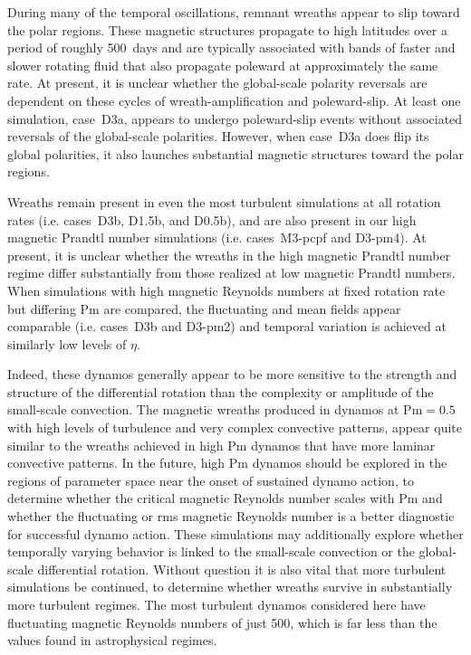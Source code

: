 During many of the temporal oscillations, remnant
wreaths appear to slip toward the polar regions.  These magnetic
structures propagate to high latitudes over a period of roughly
500~days and are typically associated with bands of faster and slower
rotating fluid that also propagate poleward at approximately the same
rate. At present, it is unclear whether the global-scale polarity
reversals are dependent on these cycles of wreath-amplification and 
poleward-slip.  At least one simulation, case~D3a, appears to undergo
poleward-slip events without associated reversals of the global-scale
polarities.  However, when case~D3a does flip its global polarities, 
it also launches substantial magnetic structures toward the polar
regions.

Wreaths remain present in even the
most turbulent simulations at all rotation rates (i.e. cases~D3b, D1.5b,
and D0.5b), and are also present in our high magnetic Prandtl number
simulations (i.e. cases~M3-pcpf and D3-pm4).  At present, it is
unclear whether the wreaths in the high magnetic Prandtl number
regime differ substantially from those realized at low magnetic
Prandtl numbers.  
When simulations with high magnetic
Reynolds numbers at fixed rotation rate but differing $\mathrm{Pm}$
are compared, the fluctuating and mean fields appear 
comparable (i.e. cases~D3b and D3-pm2) and temporal variation is
achieved at similarly low levels of $\eta$.  

Indeed, these dynamos generally appear to be more sensitive to the strength
and structure of the differential rotation than the complexity or
amplitude of the small-scale convection.  The magnetic wreaths produced in dynamos at
$\mathrm{Pm}=0.5$ with high levels of turbulence and very complex
convective patterns, appear quite similar to the wreaths achieved in high
$\mathrm{Pm}$ dynamos that have more laminar convective patterns.
In the future, high $\mathrm{Pm}$ dynamos should be explored in the regions of parameter
space near the onset of sustained dynamo action, to determine whether
the critical magnetic Reynolds number scales with $\mathrm{Pm}$ and
whether the fluctuating or rms magnetic Reynolds number is a better
diagnostic for successful dynamo action.  These simulations may 
additionally explore whether temporally varying behavior is linked to
the small-scale convection or the global-scale differential rotation.
Without question it is also vital that more turbulent simulations be
continued, to determine whether wreaths survive in substantially more
turbulent regimes.  The most turbulent dynamos considered here have
fluctuating magnetic Reynolds numbers of just 500, which is far less
than the values found in astrophysical regimes.


